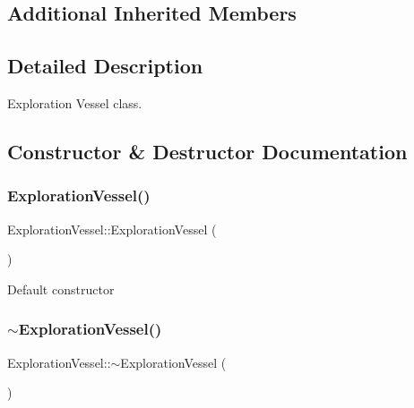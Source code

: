 \subsection*{Additional Inherited Members}


\subsection{Detailed Description}
Exploration Vessel class. 

\subsection{Constructor \& Destructor Documentation}
\mbox{\label{classExplorationVessel_ab664e2a5b901063c15d86e13f3b981f6}} 
\subsubsection{\texorpdfstring{Exploration\+Vessel()}{ExplorationVessel()}\hspace{0.1cm}{\footnotesize\ttfamily [1/2]}}
{\footnotesize\ttfamily Exploration\+Vessel\+::\+Exploration\+Vessel (\begin{DoxyParamCaption}{ }\end{DoxyParamCaption})\hspace{0.3cm}{\ttfamily [inline]}}

Default constructor \mbox{\label{classExplorationVessel_ac7b29c63250f7263808af4e21e412cce}} 
\subsubsection{\texorpdfstring{$\sim$\+Exploration\+Vessel()}{~ExplorationVessel()}}
{\footnotesize\ttfamily Exploration\+Vessel\+::$\sim$\+Exploration\+Vessel (\begin{DoxyParamCaption}{ }\end{DoxyParamCaption})\hspace{0.3cm}{\ttfamily [inline]}}

